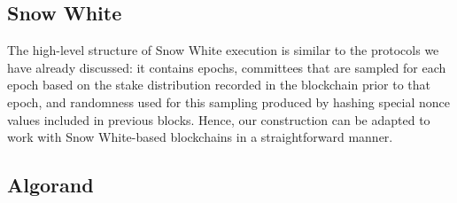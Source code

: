 
\subsection{Snow White}

The high-level structure of Snow White execution is similar to the protocols we have
already discussed: it contains epochs, committees that are sampled for each
epoch based on the stake distribution recorded in the blockchain prior to that
epoch, and randomness used for this sampling produced by hashing special nonce
values included in previous blocks. Hence, our construction can be adapted to
work with Snow White-based blockchains in a straightforward manner.


\subsection{Algorand}

